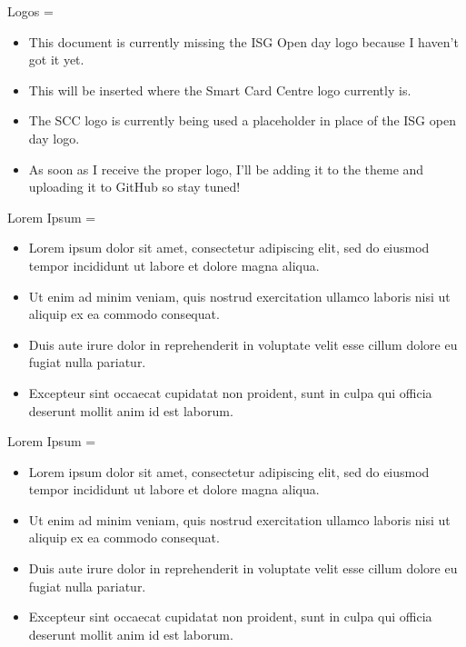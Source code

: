 \documentclass[final,hyperref={pdfpagelabels=false}]{beamer}
\newcommand{\correctitemizeindent}{\setlength{\leftmargini}{2.5em}}
\begin{document}
\begin{frame}
\begin{columns}[T]
\begin{column}{.32\textwidth}
\begin{minipage}[t]{.95\textwidth}
{		\begin{centreColumnBlock}{Logos}
			\rightskip=\leftskip
			{\correctitemizeindent
			\begin{itemize}
				\item This document is currently missing the ISG Open day logo because I haven't got it yet.  
				\item This will be inserted where the Smart Card Centre logo currently is.
				\item The SCC logo is currently being used a placeholder in place of the ISG open day logo.
				\item As soon as I receive the proper logo, I'll be adding it to the theme and uploading it to GitHub so stay tuned!
			\end{itemize}
			}
		\end{centreColumnBlock}

		\vfill

		\begin{centreColumnBlock}{Lorem Ipsum}
			\rightskip=\leftskip
			{\correctitemizeindent
			\begin{itemize}
				\item Lorem ipsum dolor sit amet, consectetur adipiscing elit, sed do eiusmod tempor incididunt ut labore et dolore magna aliqua.
				\item Ut enim ad minim veniam, quis nostrud exercitation ullamco laboris nisi ut aliquip ex ea commodo consequat.
				\item Duis aute irure dolor in reprehenderit in voluptate velit esse cillum dolore eu fugiat nulla pariatur.
				\item Excepteur sint occaecat cupidatat non proident, sunt in culpa qui officia deserunt mollit anim id est laborum.
			\end{itemize}
			}
		\end{centreColumnBlock}

		\vfill

				
		\begin{centreColumnBlock}{Lorem Ipsum}
			\rightskip=\leftskip
			{\correctitemizeindent
			\begin{itemize}
				\item Lorem ipsum dolor sit amet, consectetur adipiscing elit, sed do eiusmod tempor incididunt ut labore et dolore magna aliqua.
				\item Ut enim ad minim veniam, quis nostrud exercitation ullamco laboris nisi ut aliquip ex ea commodo consequat.
				\item Duis aute irure dolor in reprehenderit in voluptate velit esse cillum dolore eu fugiat nulla pariatur.
				\item Excepteur sint occaecat cupidatat non proident, sunt in culpa qui officia deserunt mollit anim id est laborum.
			\end{itemize}
			}
		\end{centreColumnBlock}
		}
		\end{minipage}
	\end{column}


\end{columns}
\end{frame}
\end{document}
